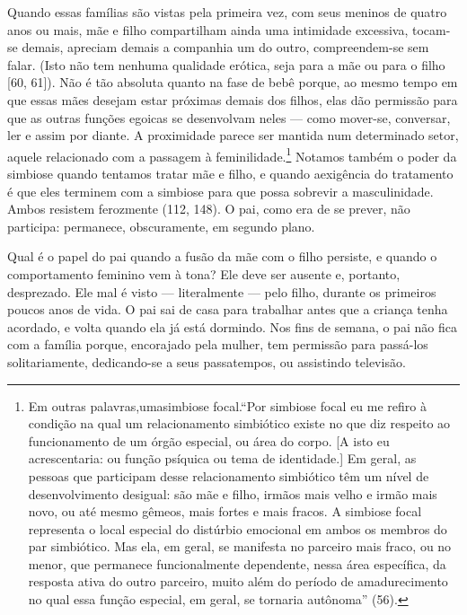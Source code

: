 Quando essas famílias são vistas pela primeira vez, com seus meninos
de quatro anos ou mais, mãe e filho compartilham ainda uma intimidade
excessiva, tocam-se demais, apreciam demais a companhia um do outro,
compreendem-se sem falar. (Isto não tem nenhuma qualidade erótica, seja
para a mãe ou para o filho [60, 61]). Não é tão absoluta quanto na fase
de bebê porque, ao mesmo tempo em que essas mães desejam estar próximas
demais dos filhos, elas dão permissão para que as outras funções
egoicas se desenvolvam neles --- como mover-se, conversar, ler e assim
por diante. A proximidade parece ser mantida num determinado setor,
aquele relacionado com a passagem à feminilidade.\footnote{ Em outras
palavras,\idxgrena[|nn] uma\idxmaesfoca[|nn] simbiose focal.\idxsimbf[|nn] ``Por simbiose focal eu me
refiro à condição na qual um relacionamento simbiótico existe no que
diz respeito ao funcionamento de um órgão especial, ou área do corpo.
[A isto eu acrescentaria: ou função psíquica ou tema de identidade.] Em
geral, as pessoas que participam desse relacionamento simbiótico têm um
nível de desenvolvimento desigual: são mãe e filho, irmãos mais velho e
irmão mais novo, ou até mesmo gêmeos, mais fortes e mais fracos. A
simbiose focal representa o local especial do distúrbio emocional em
ambos os membros do par simbiótico. Mas ela, em geral, se manifesta no
parceiro mais fraco, ou no menor, que permanece funcionalmente
dependente, nessa área específica, da resposta ativa do outro parceiro,
muito além do período de amadurecimento no qual essa função especial,
em geral, se tornaria autônoma'' (56).} Notamos também o
poder da simbiose quando tentamos tratar mãe e filho, e quando a\idxtransesimb[|)]
exigência do tratamento é que eles terminem com a simbiose para que
possa sobrevir a masculinidade. Ambos resistem ferozmente (112,
148). O pai, como era de se prever, não participa: permanece,
obscuramente, em segundo plano.

Qual é o papel do pai quando a fusão da mãe com o filho persiste, e
quando o comportamento feminino vem à tona? Ele deve ser ausente e,
portanto, desprezado. Ele mal é visto --- literalmente --- pelo
filho, durante os primeiros poucos anos de vida. O pai sai de casa para
trabalhar antes que a criança tenha acordado, e volta quando ela já
está dormindo. Nos fins de semana, o pai não fica com a família porque,
encorajado pela mulher, tem permissão para passá-los solitariamente,
dedicando-se a seus passatempos, ou assistindo televisão.

